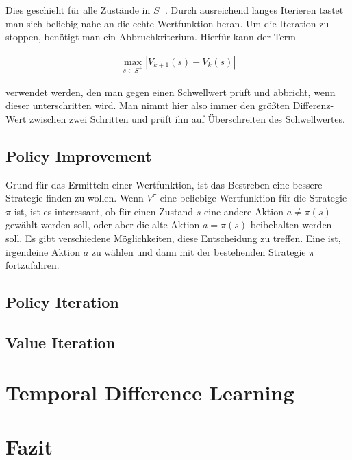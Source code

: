 \documentclass[10pt]{scrartcl}
\begin{document}
Dies geschieht für alle Zustände in $S^+$. Durch ausreichend langes Iterieren tastet man sich beliebig nahe an die echte Wertfunktion heran. Um die Iteration zu stoppen, benötigt man ein Abbruchkriterium. Hierfür kann der Term 

\begin{align*}
\max\limits_{s\in S^+} |V_{k+1}(s)-V_k(s)|
\end{align*}

verwendet werden, den man gegen einen Schwellwert prüft und abbricht, wenn dieser unterschritten wird. Man nimmt hier also immer den größten Differenz-Wert zwischen zwei Schritten und prüft ihn auf Überschreiten des Schwellwertes.


\subsection{Policy Improvement}
Grund für das Ermitteln einer Wertfunktion, ist das Bestreben eine bessere Strategie finden zu wollen. Wenn $V^\pi$ eine beliebige Wertfunktion für die  Strategie $\pi$ ist,  ist es interessant, ob für einen Zustand $s$ eine andere Aktion $a\neq\pi(s)$   gewählt werden soll, oder aber die alte Aktion $a=\pi(s)$ beibehalten werden soll.
Es gibt verschiedene Möglichkeiten, diese  Entscheidung zu treffen. Eine ist, irgendeine Aktion $a$ zu wählen und dann mit der bestehenden Strategie $\pi$ fortzufahren.

\subsection{Policy Iteration}
\subsection{Value Iteration}


\section{Temporal Difference Learning}

\section{Fazit}
\end{document}
